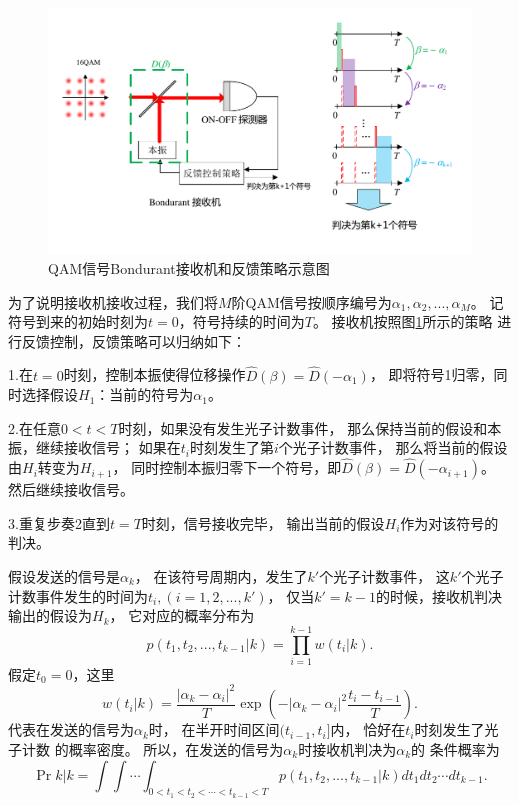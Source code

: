 \begin{figure}
\centering
  \includegraphics[width=\textwidth]{figures/chap3/Bondurant-receiver}
  \caption{QAM信号Bondurant接收机和反馈策略示意图}
  \label{fig:QAM-Bondurant-receiver}
\end{figure}

为了说明接收机接收过程，我们将$M$阶QAM信号按顺序编号为$\alpha_1,\alpha_2,...,\alpha_M$。
记符号到来的初始时刻为$t=0$，符号持续的时间为$T$。
接收机按照图\ref{fig:QAM-Bondurant-receiver}所示的策略
进行反馈控制，反馈策略可以归纳如下：

1.在$t=0$时刻，控制本振使得位移操作$\hat{D}(\beta) = \hat{D}(-\alpha_1)$，
  即将符号1归零，同时选择假设$H_1$：当前的符号为$\alpha_1$。
  
2.在任意$0<t<T$时刻，如果没有发生光子计数事件，
  那么保持当前的假设和本振，继续接收信号；
  如果在$t_i$时刻发生了第$i$个光子计数事件，
  那么将当前的假设由$H_i$转变为$H_{i+1}$，
  同时控制本振归零下一个符号，即$\hat{D}(\beta) = \hat{D}(-\alpha_{i+1})$。
  然后继续接收信号。
  
3.重复步奏2直到$t=T$时刻，信号接收完毕，
  输出当前的假设$H_i$作为对该符号的判决。
  
假设发送的信号是$\alpha_k$，
在该符号周期内，发生了$k'$个光子计数事件，
这$k'$个光子计数事件发生的时间为$t_i,(i=1,2,...,k')$，
仅当$k' = k-1$的时候，接收机判决输出的假设为$H_k$，
它对应的概率分布为
\begin{equation}
p(t_1,t_2,...,t_{k-1}|k) = \prod_{i=1}^{k-1} w(t_i|k).
\end{equation}
假定$t_0=0$，这里
\begin{equation}
w(t_i|k) =  \frac{|\alpha_k - \alpha_i|^2}{T} \exp(-|\alpha_k - \alpha_i|^2 \frac{t_i-t_{i-1}}{T}) .
\label{eq:w-cond}
\end{equation}
代表在发送的信号为$\alpha_k$时，
在半开时间区间$(t_{i-1}, t_i]$内，
恰好在$t_i$时刻发生了光子计数
的概率密度。
所以，在发送的信号为$\alpha_k$时接收机判决为$\alpha_k$的
条件概率为
\begin{equation}
\Pr{k|k} = \int\int\cdots\int_{0<t_1<t_2<\cdots<t_{k-1}<T} p(t_1,t_2,...,t_{k-1}|k) dt_1 dt_2 \cdots dt_{k-1}.
\label{eq:QAM-cond-prob}
\end{equation}

